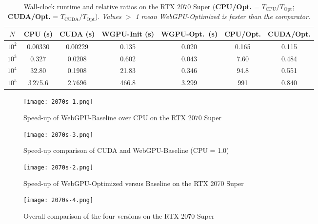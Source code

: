 \documentclass[PhD]{PHlab-thesis}
\begin{document}
\begin{table}[h]
  \centering
  \renewcommand{\arraystretch}{2}
  \setlength{\tabcolsep}{4pt}
  \small
  \begin{tabular}{|c|c|c|c|c|c|c|}
    \hline
    $N$ & CPU (s) & CUDA (s) & WGPU-Init (s) & WGPU-Opt.\ (s) & CPU/Opt. & CUDA/Opt. \\
    \hline
    $10^{2}$ & 0.00330 & 0.00229 & 0.135 & 0.020 & 0.165 & 0.115 \\
    $10^{3}$ & 0.327   & 0.0208  & 0.602 & 0.043 & 7.60  & 0.484 \\
    $10^{4}$ & 32.80   & 0.1908  & 21.83 & 0.346 & 94.8  & 0.551 \\
    $10^{5}$ & 3\,275.6 & 2.7696 & 466.8 & 3.299 & 991 & 0.840 \\
    \hline
  \end{tabular}
  \caption{Wall-clock runtime and relative ratios on the RTX 2070 Super
           (\textbf{CPU/Opt.} = $T_{\text{CPU}}/T_{\text{Opt}}$;
            \textbf{CUDA/Opt.} = $T_{\text{CUDA}}/T_{\text{Opt}}$).
           \emph{Values $>$ 1 mean WebGPU-Optimized is faster than the
           comparator.}}
  \label{tab:rtx_performance}
\end{table}



\begin{figure}[htbp]
  \centering
  \texttt{[image: 2070s-1.png]}
  \caption{Speed-up of WebGPU-Baseline over CPU on the RTX 2070 Super}
  \label{fig:2070s-wgpu-baseline}
\end{figure}

\begin{figure}[htbp]
  \centering
  \texttt{[image: 2070s-3.png]}
  \caption{Speed-up comparison of CUDA and WebGPU-Baseline (CPU = 1.0)}
  \label{fig:2070s-cuda-vs-baseline}
\end{figure}

\begin{figure}[htbp]
  \centering
  \texttt{[image: 2070s-2.png]}
  \caption{Speed-up of WebGPU-Optimized versus Baseline on the RTX 2070 Super}
  \label{fig:2070s-optimized-vs-baseline}
\end{figure}

\begin{figure}[htbp]
  \centering
  \texttt{[image: 2070s-4.png]}
  \caption{Overall comparison of the four versions on the RTX 2070 Super}
  \label{fig:2070s-overall-4versions}
\end{figure}
\newpage
\end{document}
